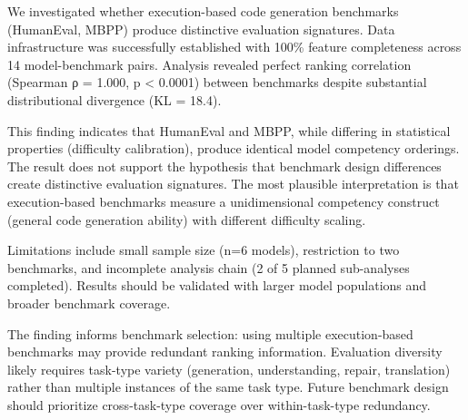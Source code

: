 
We investigated whether execution-based code generation benchmarks (HumanEval, MBPP) produce distinctive evaluation signatures. Data infrastructure was successfully established with 100\% feature completeness across 14 model-benchmark pairs. Analysis revealed perfect ranking correlation (Spearman ρ = 1.000, p < 0.0001) between benchmarks despite substantial distributional divergence (KL = 18.4).

This finding indicates that HumanEval and MBPP, while differing in statistical properties (difficulty calibration), produce identical model competency orderings. The result does not support the hypothesis that benchmark design differences create distinctive evaluation signatures. The most plausible interpretation is that execution-based benchmarks measure a unidimensional competency construct (general code generation ability) with different difficulty scaling.

Limitations include small sample size (n=6 models), restriction to two benchmarks, and incomplete analysis chain (2 of 5 planned sub-analyses completed). Results should be validated with larger model populations and broader benchmark coverage.

The finding informs benchmark selection: using multiple execution-based benchmarks may provide redundant ranking information. Evaluation diversity likely requires task-type variety (generation, understanding, repair, translation) rather than multiple instances of the same task type. Future benchmark design should prioritize cross-task-type coverage over within-task-type redundancy.
